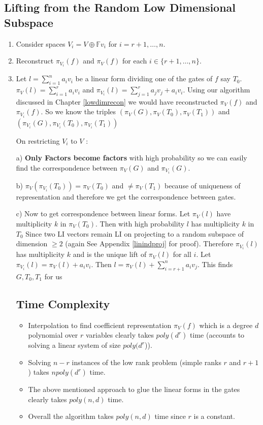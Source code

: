 \documentclass[letterpaper,USenglish,numberwithinsect]{lipics}
\newcommand{\F}{\mathbb{F}}
\begin{document}
\subsection{Lifting from the Random Low Dimensional Subspace}\label{liftingback}
\begin{enumerate}
\item Consider spaces $V_i = V \oplus \F v_{i}$ for $i=r+1,\ldots,n$.
\item Reconstruct $\pi_{V_i}(f)$ and $\pi_V(f)$ for each $i\in \{r+1,\ldots,n\}$.
\item Let $l = \sum\limits_{i=1}^n a_iv_i $ be a linear form dividing one of the
gates of $f$ say $T_0$. $\pi_V(l) = \sum\limits_{i=1}^r a_iv_i $ and $\pi_{V_i}(l) =
\sum\limits_{j=1}^{r} a_jv_j + a_iv_i$. Using our algorithm discussed in Chapter
\ref{lowdimrecon} we would have reconstructed $\pi_V(f)$ and $\pi_{V_i}(f)$. So
we know the triples
    $(\pi_V(G), \pi_V(T_0),\pi_V(T_1))$ and
$(\pi_{V_i}(G), \pi_{V_i}(T_0),\pi_{V_i}(T_1))$

     On restricting $V_i$ to $V$ :

     a) {\bf Only Factors become factors} with high probability so we can easily
find the correspondence between $\pi_V(G)$ and $\pi_{V_i}(G)$.

     b)  $\pi_V(\pi_{V_i}(T_0)) = \pi_V(T_0)$ and $\neq \pi_V (T_1)$
because of uniqueness of representation and therefore we get the correspondence between gates.

     c) Now to get correspondence between linear forms. Let $\pi_V(l)$
have multiplicity $k$ in $\pi_V(T_0)$. Then with high probability
$l$ has multiplicity $k$ in $T_0$
    Since two LI vectors remain LI on projecting to a random subspace of
dimension $\geq 2$ (again See Appendix \ref{linindproj} for proof). Therefore
$\pi_{V_i}(l)$ has multiplicity $k$ and is the unique lift of
    $\pi_V(l)$ for all $i$. Let $\pi_{V_i}(l) = \pi_V(l) + a_iv_i$.
Then $l = \pi_V(l) + \sum_{i=r+1}^n a_iv_j$. This finds $G,T_0,T_1$ for us

\subsection{Time Complexity}
\begin{itemize}
 \item Interpolation to find coefficient representation $\pi_V(f)$ which is a degree $d$ polynomial over $r$ variables
 clearly takes $poly(d^r)$ time (accounts to solving a linear system of size $poly(d^r$)).
 \item Solving $n-r$ instances of the low rank problem (simple ranks $r$ and $r+1$) takes $npoly(d^r)$ time.
 \item The above mentioned approach to glue the linear forms in the gates clearly takes $poly(n,d)$ time.
 \item Overall the algorithm takes $poly(n,d)$ time since $r$ is a constant.
\end{itemize}


\end{enumerate}
\end{document}
